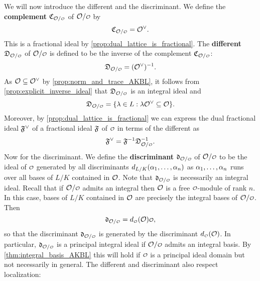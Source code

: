    We will now introduce the different and the discriminant. We define the \textbf{complement} $\mf{C}_{\mc{O}/\smc{O}}$ of $\mc{O}/\smc{O}$ by
    \[
      \mf{C}_{\mc{O}/\smc{O}} = \mc{O}^{\vee}.  
    \]
    This is a fractional ideal by \cref{prop:dual_lattice_is_fractional}. The \textbf{different} $\mf{D}_{\mc{O}/\smc{O}}$ of $\mc{O}/\smc{O}$ is defined to be the inverse of the complement $\mf{C}_{\mc{O}/\smc{O}}$: 
    \[
      \mf{D}_{\mc{O}/\smc{O}} = (\mc{O}^{\vee})^{-1}.  
    \]
    As $\mathcal{O} \subseteq \mathcal{O}^{\vee}$ by \cref{prop:norm_and_trace_AKBL}, it follows from \cref{prop:explicit_inverse_ideal} that $\mf{D}_{\mc{O}/\smc{O}}$ is an integral ideal and
    \[
      \mf{D}_{\mc{O}/\smc{O}} = \{\l \in L: \l\mc{O}^{\vee} \subseteq \mc{O}\}.  
    \]
    Moreover, by \cref{prop:dual_lattice_is_fractional} we can express the dual fractional ideal $\mathfrak{F}^{\vee}$ of a fractional ideal $\mathfrak{F}$ of $\smc{O}$ in terms of the different as
    \[
      \mf{F}^{\vee} = \mf{F}^{-1}\mf{D}_{\mc{O}/\smc{O}}^{-1}.
    \]
    Now for the discriminant. We define the \textbf{discriminant} $\mf{d}_{\mc{O}/\smc{O}}$ of $\mc{O}/\smc{O}$ to be the ideal of $\smc{O}$ generated by all discriminants $d_{L/K}(\alpha_{1},\ldots,\alpha_{n})$ as $\alpha_{1},\ldots,\alpha_{n}$ runs over all bases of $L/K$ contained in $\mathcal{O}$. Note that $\mf{d}_{\mc{O}/\smc{O}}$ is necessarily an integral ideal. Recall that if $\mc{O}/\smc{O}$ admits an integral then $\mathcal{O}$ is a free $\smc{O}$-module of rank $n$. In this case, bases of $L/K$ contained in $\mathcal{O}$ are precisely the integral bases of $\mc{O}/\smc{O}$. Then
    \[
      \mf{d}_{\mc{O}/\smc{O}} = d_{\smc{O}}(\mc{O})\smc{O},
    \]
    so that the discriminant $\mf{d}_{\mc{O}/\smc{O}}$ is generated by the discriminant $d_{\smc{O}}(\mc{O})$. In particular, $\mf{d}_{\mc{O}/\smc{O}}$ is a principal integral ideal if $\mc{O}/\smc{O}$ admits an integral basis. By \cref{thm:integral_basis_AKBL} this will hold if $\smc{O}$ is a principal ideal domain but not necessarily in general. The different and discriminant also respect localization:

